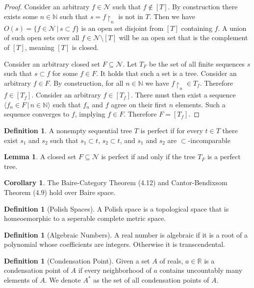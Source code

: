 \documentclass{article}
\theoremstyle{definition}
\newtheorem{crly}[thm]{Corollary}
\newtheorem{defn}[thm]{Definition}
\newtheorem{lmma}[thm]{Lemma}
\newcommand{\N}{\mathbb{N}}
\newcommand{\R}{\mathbb{R}}
\begin{document}
\begin{proof}
    Consider an arbitrary $f \in \mathcal{N}$ such that $f \not\in [T]$. By construction there exists some $n \in \N$ such that $s = f\restriction_n$ is not in $T$. Then we have $O(s) = \{f \in \mathcal{N} \, | \, s \subset f\}$ is an open set disjoint from $[T]$ containing $f$. A union of such open sets over all $f \in \mathcal{N} \setminus [T]$ will be an open set that is the complement of $[T]$, meaning $[T]$ is closed.

    Consider an arbitrary closed set $F \subseteq \mathcal{N}$. Let $T_F$ be the set of all finite sequences $s$ such that $s \subset f$ for some $f \in F$. It holds that such a set is a tree. Consider an arbitrary $f \in F$. By construction, for all $n \in \N$ we have $f \restriction_{n} \in T_f$. Therefore $f \in [T_f]$. Consider an arbitrary $f \in [T_f]$. There must then exist a sequence $\langle f_n \in F \, | \, n \in \N \rangle$ such that $f_n$ and $f$ agree on their first $n$ elements. Such a sequence converges to $f$, implying $f \in F$. Therefore $F = [T_f]$.
\end{proof}

\begin{defn}
    A nonempty sequential tree $T$ is perfect if for every $t \in T$ there exist $s_1$ and $s_2$ such that $s_1 \subset t$, $s_2 \subset t$, and $s_1$ and $s_2$ are $\subset$-incomparable
\end{defn}

\begin{lmma}
    A closed set $F \subseteq \mathcal{N}$ is perfect if and only if the tree $T_F$ is a perfect tree.
\end{lmma}

\begin{crly}
    The Baire-Category Theorem (4.12) and Cantor-Bendixsom Theorem (4.9) hold over Baire space.
\end{crly}

\begin{defn}[Polish Spaces]
    A Polish space is a topological space that is homeoemorphic to a seperable complete metric space. 
\end{defn}

\begin{defn}[Algebraic Numbers]
    A real number is algebraic if it is a root of a polynomial whose coefficients are integers. Otherwise it is transcendental.
\end{defn}

\begin{defn}[Condensation Point]
    Given a set $A$ of reals, $a \in \R$ is a condensation point of $A$ if every neighborhood of $a$ contains uncountably many elements of $A$. We denote $A^*$ as the set of all condensation points of $A$.
\end{defn}
\end{document}
